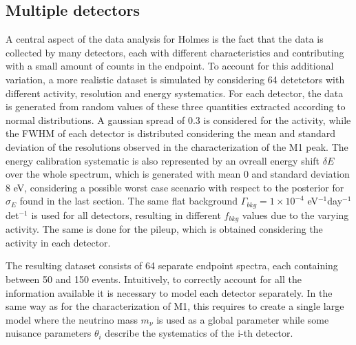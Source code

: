\subsection{Multiple detectors}
A central aspect of the data analysis for Holmes is the fact that the data is collected by many detectors, each with different characteristics and contributing with a small amount of counts in the endpoint. 
To account for this additional variation, a more realistic dataset is simulated by considering 64 detetctors with different activity, resolution and energy
systematics. For each detector, the data is generated from random values of these three quantities extracted according
to normal distributions. A gaussian spread of 0.3 is considered for the activity, while the FWHM of each detector is
distributed considering the mean and standard deviation of the resolutions observed in the characterization of the M1
peak. The energy calibration systematic is also represented by an ovreall energy shift $\delta E$ over the whole
spectrum, which is generated with mean 0 and standard deviation $8$ eV, considering a possible worst case scenario with respect
to the posterior for  $\sigma_E$ found in the last section. The same flat background $\Gamma_{bkg}=1\times 10^{-4}$ eV$^{-1}$day$^{-1}
$det$^{-1}$ is used for all detectors, resulting in different $f_{bkg}$ values due to the varying activity. The same
is done for the pileup, which is obtained considering the activity in each detector. 

The resulting dataset consists of 64 separate endpoint spectra, each containing between 50 and 150 events. 
Intuitively, to correctly account for all the information available it is necessary to model each detector separately.
In the same way as for the characterization of M1, this requires to create a single large model where the neutrino mass $m_\nu$ is used as a global parameter while some nuisance parameters $\theta_i$ describe the systematics of the i-th detector.


